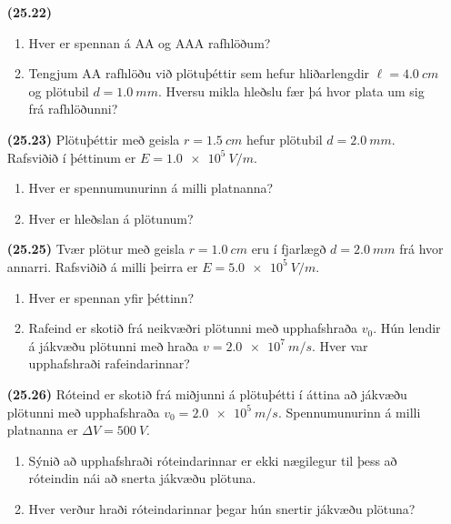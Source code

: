 \begin{enumerate}[label = \textbf{(\alph*)}]

\item[\textbf{(25.22)}] \begin{enumerate}[label = \textbf{(\alph*)}]
    \item Hver er spennan á AA og AAA rafhlöðum?
    \item Tengjum AA rafhlöðu við plötuþéttir sem hefur hliðarlengdir $\ell = \SI{4.0}{cm}$ og plötubil $d = \SI{1.0}{mm}$. Hversu mikla hleðslu fær þá hvor plata um sig frá rafhlöðunni?
\end{enumerate}

\item[\textbf{(25.23)}] Plötuþéttir með geisla $r = \SI{1.5}{cm}$ hefur plötubil $d = \SI{2.0}{mm}$. Rafsviðið í þéttinum er $E = \SI{1.0e5}{V/m}$. 
\begin{enumerate}[label = \textbf{(\alph*)}]
    \item Hver er spennumunurinn á milli platnanna?
    \item Hver er hleðslan á plötunum?
\end{enumerate}

\item[\textbf{(25.25)}] Tvær plötur með geisla $r = \SI{1.0}{cm}$ eru í fjarlægð $d = \SI{2.0}{mm}$ frá hvor annarri. Rafsviðið á milli þeirra er $E = \SI{5.0e5}{V/m}$.
\begin{enumerate}[label = \textbf{(\alph*)}]
    \item Hver er spennan yfir þéttinn?
    \item Rafeind er skotið frá neikvæðri plötunni með upphafshraða $v_0$. Hún lendir á jákvæðu plötunni með hraða $v = \SI{2.0e7}{m/s}$. Hver var upphafshraði rafeindarinnar? 
\end{enumerate}

\item[\textbf{(25.26)}] Róteind er skotið frá miðjunni á plötuþétti í áttina að jákvæðu plötunni með upphafshraða $v_0 = \SI{2.0e5}{m/s}$. Spennumunurinn á milli platnanna er $\Delta V = \SI{500}{V}$.

\begin{enumerate}[label = \textbf{(\alph*)}]
    \item Sýnið að upphafshraði róteindarinnar er ekki nægilegur til þess að róteindin nái að snerta jákvæðu plötuna.
    \item Hver verður hraði róteindarinnar þegar hún snertir jákvæðu plötuna?
\end{enumerate}

\end{enumerate}

